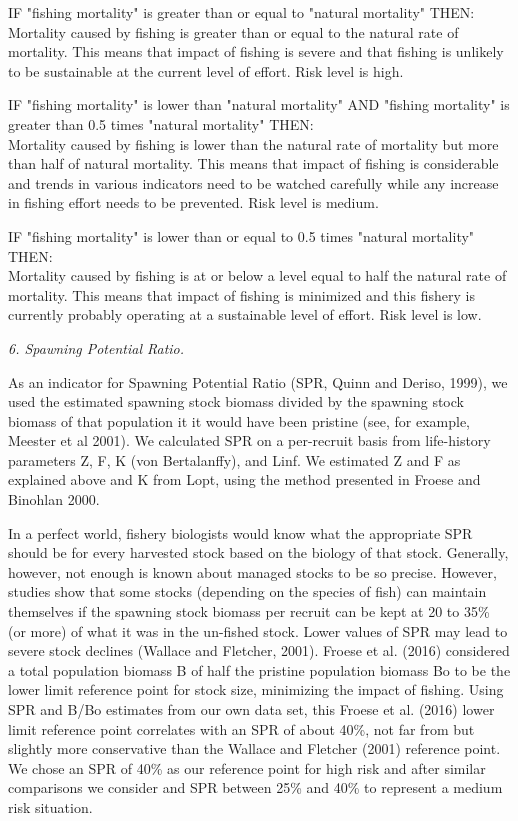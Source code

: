 IF "fishing mortality" is greater than or equal to "natural mortality" THEN:\\[0cm]
Mortality caused by fishing is greater than or equal to the natural rate of mortality. This means that impact of fishing is severe and that fishing is unlikely to be sustainable at the current level of effort. Risk level is high.

IF "fishing mortality" is lower than "natural mortality" AND "fishing mortality" is greater than 0.5 times "natural mortality" THEN:\\[0cm]
Mortality caused by fishing is lower than the natural rate of mortality but more than half of natural mortality. This means that impact of fishing is considerable and trends in various indicators need to be watched carefully while any increase in fishing effort needs to be prevented. Risk level is medium.

IF "fishing mortality" is lower than or equal to 0.5 times "natural mortality" THEN:\\[0cm]
Mortality caused by fishing is at or below a level equal to half the natural rate of mortality. This means that impact of fishing is minimized and this fishery is currently probably operating at a sustainable level of effort. Risk level is low.

\clearpage
\newpage

\textit{6. Spawning Potential Ratio.}

As an indicator for Spawning Potential Ratio (SPR, Quinn and Deriso, 1999), we used the estimated spawning stock biomass divided by the spawning stock biomass of that population it it would have been pristine (see, for example, Meester et al 2001). We calculated SPR on a per-recruit basis from life-history parameters Z, F, K (von Bertalanffy), and Linf. We estimated Z and F as explained above and K from Lopt, using the method presented in Froese and Binohlan 2000.

In a perfect world, fishery biologists would know what the appropriate SPR should be for every harvested stock based on the biology of that stock. Generally, however, not enough is known about managed stocks to be so precise. However, studies show that some stocks (depending on the species of fish) can maintain themselves if the spawning stock biomass per recruit can be kept at 20 to 35\% (or more) of what it was in the un-fished stock. Lower values of SPR may lead to severe stock declines (Wallace and Fletcher, 2001). Froese et al. (2016) considered a total population biomass B of half the pristine population biomass Bo to be the lower limit reference point for stock size, minimizing the impact of fishing. Using SPR and B/Bo estimates from our own data set, this Froese et al. (2016) lower limit reference point correlates with an SPR of about 40\%, not far from but slightly more conservative than the Wallace and Fletcher (2001) reference point. We chose an SPR of 40\% as our reference point for high risk and after similar comparisons we consider and SPR between 25\% and 40\% to represent a medium risk situation.

